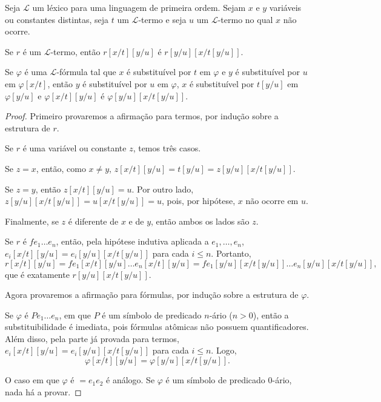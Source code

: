 \begin{metalemma}\label{mlem:substituicaoComposta}
    Seja $\mathcal L$ um léxico para uma linguagem de primeira ordem.
    Sejam $x$ e $y$ variáveis ou constantes distintas, seja $t$ um $\mathcal L$-termo e seja $u$ um $\mathcal L$-termo no qual $x$ não ocorre.

    Se $r$ é um $\mathcal L$-termo, então $r[x/t][y/u]$ é $r[y/u][x/t[y/u]]$.

    Se $\varphi$ é uma $\mathcal L$-fórmula tal que $x$ é substituível por $t$ em $\varphi$ e $y$ é substituível por $u$ em $\varphi[x/t]$, então $y$ é substituível por $u$ em $\varphi$, $x$ é substituível por $t[y/u]$ em $\varphi[y/u]$ e $\varphi[x/t][y/u]$ é $\varphi[y/u][x/t[y/u]]$.
\end{metalemma}

\begin{proof}
    Primeiro provaremos a afirmação para termos, por indução sobre a estrutura de $r$.

    Se $r$ é uma variável ou constante $z$, temos três casos.

    Se $z=x$, então, como $x\neq y$, $z[x/t][y/u]=t[y/u]=z[y/u][x/t[y/u]]$.

    Se $z=y$, então $z[x/t][y/u]=u$.
    Por outro lado, $z[y/u][x/t[y/u]]=u[x/t[y/u]]=u$, pois, por hipótese, $x$ não ocorre em $u$.
    
    Finalmente, se $z$ é diferente de $x$ e de $y$, então ambos os lados são $z$.

    Se $r$ é $fe_1\dots e_n$, então, pela hipótese indutiva aplicada a $e_1,\dots,e_n$, $e_i[x/t][y/u]=e_i[y/u][x/t[y/u]]$ para cada $i\leq n$.
     Portanto,
    \[
        r[x/t][y/u]
        =
        fe_1[x/t][y/u]\dots e_n[x/t][y/u]
        =
        fe_1[y/u][x/t[y/u]]\dots e_n[y/u][x/t[y/u]],
    \]
    que é exatamente $r[y/u][x/t[y/u]]$.

    Agora provaremos a afirmação para fórmulas, por indução sobre a estrutura de $\varphi$.

    Se $\varphi$ é $P e_1\dots e_n$, em que $P$ é um símbolo de predicado $n$-ário ($n>0$), então a substituibilidade é imediata, pois fórmulas atômicas não possuem quantificadores.
    Além disso, pela parte já provada para termos, $e_i[x/t][y/u]=e_i[y/u][x/t[y/u]]$
    para cada $i\leq n$.
    Logo,
    \[
        \varphi[x/t][y/u]=\varphi[y/u][x/t[y/u]].
    \]

    O caso em que $\varphi$ é $=e_1e_2$ é análogo.
    Se $\varphi$ é um símbolo de predicado 0-ário, nada há a provar.


\end{proof}
